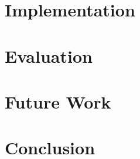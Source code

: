 \documentclass{article}
\begin{document}
\section{Implementation}

\section{Evaluation}

\section{Future Work}

\section{Conclusion}



\end{document}
